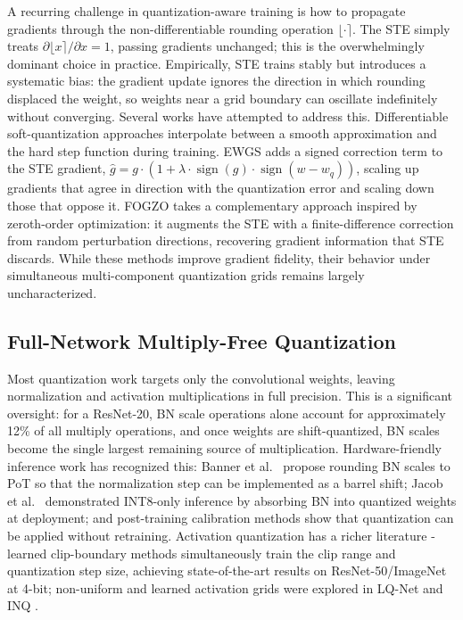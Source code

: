 \documentclass[12pt]{article}
\begin{document}
A recurring challenge in quantization-aware training is how to propagate gradients through the non-differentiable rounding operation $\lfloor \cdot \rceil$. The STE \cite{bengio2013ste,hubara2016bnn} simply treats $\partial \lfloor x \rceil / \partial x = 1$, passing gradients unchanged; this is the overwhelmingly dominant choice in practice. Empirically, STE trains stably but introduces a systematic bias: the gradient update ignores the direction in which rounding displaced the weight, so weights near a grid boundary can oscillate indefinitely without converging. Several works have attempted to address this. Differentiable soft-quantization approaches \cite{guo2019dsq} interpolate between a smooth approximation and the hard step function during training. EWGS \cite{lee2021ewgs} adds a signed correction term to the STE gradient, $\hat{g} = g \cdot (1 + \lambda \cdot \operatorname{sign}(g) \cdot \operatorname{sign}(w - w_q))$, scaling up gradients that agree in direction with the quantization error and scaling down those that oppose it. FOGZO \cite{chen2025fogzo} takes a complementary approach inspired by zeroth-order optimization: it augments the STE with a finite-difference correction from random perturbation directions, recovering gradient information that STE discards. While these methods improve gradient fidelity, their behavior under simultaneous multi-component quantization grids remains largely uncharacterized.

\subsection{Full-Network Multiply-Free Quantization}

Most quantization work targets only the convolutional weights, leaving normalization and activation multiplications in full precision. This is a significant oversight: for a ResNet-20, BN scale operations alone account for approximately 12\% of all multiply operations, and once weights are shift-quantized, BN scales become the single largest remaining source of multiplication. Hardware-friendly inference work has recognized this: Banner et al.\ \cite{banner2018pobn} propose rounding BN scales to PoT so that the normalization step can be implemented as a barrel shift; Jacob et al.\ \cite{jacob2018quantization} demonstrated INT8-only inference by absorbing BN into quantized weights at deployment; and post-training calibration methods \cite{nagel2019datafree} show that quantization can be applied without retraining. Activation quantization has a richer literature - learned clip-boundary methods \cite{esser2020lsq} simultaneously train the clip range and quantization step size, achieving state-of-the-art results on ResNet-50/ImageNet at 4-bit; non-uniform and learned activation grids were explored in LQ-Net \cite{zhang2018lq} and INQ \cite{zhou2017inq}.
\end{document}
